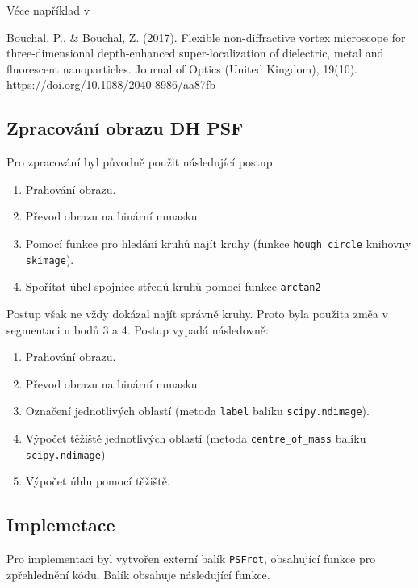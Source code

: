 \documentclass[11pt]{article}
\providecommand{\tightlist}{%
      \setlength{\itemsep}{0pt}\setlength{\parskip}{0pt}}
\begin{document}
Véce například v

Bouchal, P., \& Bouchal, Z. (2017). Flexible non-diffractive vortex
microscope for three-dimensional depth-enhanced super-localization of
dielectric, metal and fluorescent nanoparticles. Journal of Optics
(United Kingdom), 19(10). https://doi.org/10.1088/2040-8986/aa87fb

\hypertarget{zpracovuxe1nuxed-obrazu-dh-psf}{%
\subsection{Zpracování obrazu DH
PSF}\label{zpracovuxe1nuxed-obrazu-dh-psf}}

Pro zpracování byl původně použit následující postup.

\begin{enumerate}
\def\labelenumi{\arabic{enumi}.}
\tightlist
\item
  Prahování obrazu.
\item
  Převod obrazu na binární mmasku.
\item
  Pomocí funkce pro hledání kruhů najít kruhy (funkce
  \texttt{hough\_circle} knihovny \texttt{skimage}).
\item
  Spořítat úhel spojnice středů kruhů pomocí funkce \texttt{arctan2}
\end{enumerate}

Postup však ne vždy dokázal najít správně kruhy. Proto byla použita změa
v segmentaci u bodů 3 a 4. Postup vypadá následovně:

\begin{enumerate}
\def\labelenumi{\arabic{enumi}.}
\tightlist
\item
  Prahování obrazu.
\item
  Převod obrazu na binární mmasku.
\item
  Označení jednotlivých oblastí (metoda \texttt{label} balíku
  \texttt{scipy.ndimage}).
\item
  Výpočet těžiště jednotlivých oblastí (metoda \texttt{centre\_of\_mass}
  balíku \texttt{scipy.ndimage})
\item
  Výpočet úhlu pomocí těžiště.
\end{enumerate}

\hypertarget{implemetace}{%
\subsection{Implemetace}\label{implemetace}}

Pro implementaci byl vytvořen externí balík \texttt{PSFrot}, obsahující
funkce pro zpřehlednění kódu. Balík obsahuje následující funkce.
\end{document}
